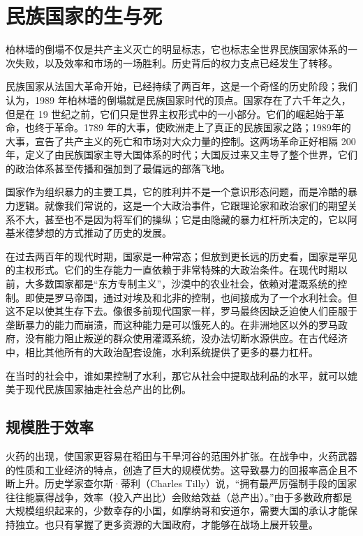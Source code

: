 \section{民族国家的生与死}
柏林墙的倒塌不仅是共产主义灭亡的明显标志，它也标志全世界民族国家体系的一次失败，以及效率和市场的一场胜利。历史背后的权力支点已经发生了转移。

民族国家从法国大革命开始，已经持续了两百年，这是一个奇怪的历史阶段；我们认为，1989 年柏林墙的倒塌就是民族国家时代的顶点。国家存在了六千年之久，但是在 19 世纪之前，它们只是世界主权形式中的一小部分。它们的崛起始于革命，也终于革命。1789 年的大事，使欧洲走上了真正的民族国家之路；1989年的大事，宣告了共产主义的死亡和市场对大众力量的控制。这两场革命正好相隔 200 年，定义了由民族国家主导大国体系的时代；大国反过来又主导了整个世界，它们的政治体系甚至传播和强加到了最偏远的部落飞地。

国家作为组织暴力的主要工具，它的胜利并不是一个意识形态问题，而是冷酷的暴力逻辑。就像我们常说的，这是一个大政治事件，它跟理论家和政治家们的期望关系不大，甚至也不是因为将军们的操纵；它是由隐藏的暴力杠杆所决定的，它以阿基米德梦想的方式推动了历史的发展。

在过去两百年的现代时期，国家是一种常态；但放到更长远的历史看，国家是罕见的主权形式。它们的生存能力一直依赖于非常特殊的大政治条件。在现代时期以前，大多数国家都是“东方专制主义”，沙漠中的农业社会，依赖对灌溉系统的控制。即使是罗马帝国，通过对埃及和北非的控制，也间接成为了一个水利社会。但这不足以使其生存下去。像很多前现代国家一样，罗马最终因缺乏迫使人们臣服于垄断暴力的能力而崩溃，而这种能力是可以饿死人的。在非洲地区以外的罗马政府，没有能力阻止叛逆的群众使用灌溉系统，没办法切断水源供应。在古代经济中，相比其他所有的大政治配套设施，水利系统提供了更多的暴力杠杆。

在当时的社会中，谁如果控制了水利，那它从社会中提取战利品的水平，就可以媲美于现代民族国家抽走社会总产出的比例。

\subsection{规模胜于效率}
火药的出现，使国家更容易在稻田与干旱河谷的范围外扩张。在战争中，火药武器的性质和工业经济的特点，创造了巨大的规模优势。这导致暴力的回报率高企且不断上升。历史学家查尔斯·蒂利（Charles Tilly）说，“拥有最严厉强制手段的国家往往能赢得战争，效率（投入产出比）会败给效益（总产出）。”由于多数政府都是大规模组织起来的，少数幸存的小国，如摩纳哥和安道尔，需要大国的承认才能保持独立。也只有掌握了更多资源的大国政府，才能够在战场上展开较量。

